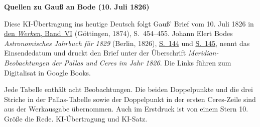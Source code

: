 \clearpage\thispagestyle{empty}
\begin{center}\textbf{Quellen zu Gauß an Bode (10. Juli 1826)}\end{center}
\noindent Diese KI-Übertragung ins heutige Deutsch folgt Gauß’ Brief vom 10. Juli 1826 in \href{https://gdz.sub.uni-goettingen.de/id/PPN236007467}{den \textit{Werken}, Band~VI} (Göttingen, 1874), S.~454--455. Johann Elert Bodes \textit{Astronomisches Jahrbuch für 1829} (Berlin, 1826), \href{https://books.google.nl/books?id=LxwPAAAAQAAJ&pg=PA144&redir_esc=y}{S.~144} und \href{https://books.google.nl/books?id=LxwPAAAAQAAJ&pg=PA145&redir_esc=y}{S.~145}, nennt das Einsendedatum und druckt den Brief unter der Überschrift \textit{Meridian-Beobachtungen der Pallas und Ceres im Jahr 1826}. Die Links führen zum Digitalisat in Google Books.
\par\smallskip\noindent Jede Tabelle enthält acht Beobachtungen. Die beiden Doppelpunkte und die drei Striche in der Pallas-Tabelle sowie der Doppelpunkt in der ersten Ceres-Zeile sind aus der Werkausgabe übernommen. Auch im Erstdruck ist von einem Stern 10. Größe die Rede. KI-Übertragung und KI-Satz.
\clearpage
